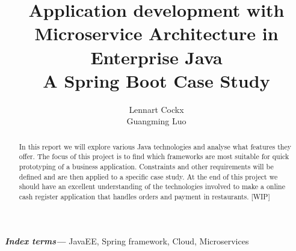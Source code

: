 \documentclass[12pt]{article}
\title{Application development with\\ Microservice Architecture in Enterprise Java\\ A Spring Boot Case Study}
\author{Lennart Cockx\\Guangming Luo}
\providecommand{\keywords}[1]{\textbf{\textit{Index terms---}} #1}
\begin{document}
\maketitle
\newpage
\tableofcontents
\newpage

\begin{abstract}
\noindent In this report we will explore various Java technologies and analyse what features they offer. The focus of this project is to find which frameworks are most suitable for quick prototyping of a business application. Constraints and other requirements will be defined and are then applied to a specific case study. At the end of this project we should have an excellent understanding of the technologies involved to make a online cash register application that handles orders and payment in restaurants. [WIP]
\end{abstract}
\keywords{JavaEE, Spring framework, Cloud, Microservices}
\end{document}
